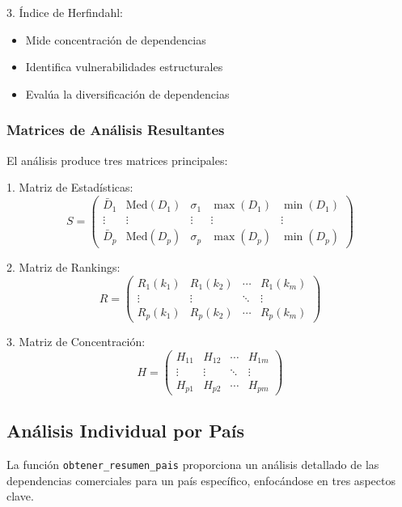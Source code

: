 \documentclass[11pt,a4paper]{article}
\begin{document}
3. Índice de Herfindahl:
\begin{itemize}
    \item Mide concentración de dependencias
    \item Identifica vulnerabilidades estructurales
    \item Evalúa la diversificación de dependencias
\end{itemize}

\subsubsection{Matrices de Análisis Resultantes}

El análisis produce tres matrices principales:

1. Matriz de Estadísticas:
\begin{equation}
S = \begin{pmatrix}
\bar{D}_1 & \text{Med}(D_1) & \sigma_1 & \max(D_1) & \min(D_1) \\
\vdots & \vdots & \vdots & \vdots & \vdots \\
\bar{D}_p & \text{Med}(D_p) & \sigma_p & \max(D_p) & \min(D_p)
\end{pmatrix}
\end{equation}

2. Matriz de Rankings:
\begin{equation}
R = \begin{pmatrix}
R_1(k_1) & R_1(k_2) & \cdots & R_1(k_m) \\
\vdots & \vdots & \ddots & \vdots \\
R_p(k_1) & R_p(k_2) & \cdots & R_p(k_m)
\end{pmatrix}
\end{equation}

3. Matriz de Concentración:
\begin{equation}
H = \begin{pmatrix}
H_{11} & H_{12} & \cdots & H_{1m} \\
\vdots & \vdots & \ddots & \vdots \\
H_{p1} & H_{p2} & \cdots & H_{pm}
\end{pmatrix}
\end{equation}

\subsection{Análisis Individual por País}

La función \texttt{obtener\_resumen\_pais} proporciona un análisis detallado de las dependencias comerciales para un país específico, enfocándose en tres aspectos clave.
\end{document}
